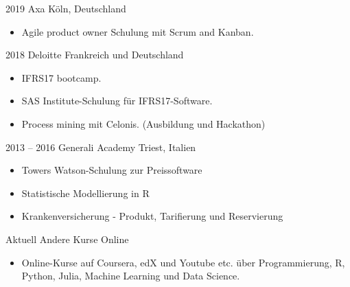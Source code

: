 \documentclass[a4paper,]{fortysecondscv}
\begin{document}
\begin{cvtable}[2]
    \cvitem
    {2019}
    {Axa}
    {Köln, Deutschland}
    {
        \vspace{-\topsep}
        \begin{itemize}[nosep, leftmargin=0pt, label={}]
            \item Agile product owner Schulung mit Scrum and Kanban.
        \end{itemize}
    }
    \cvitem
    {2018}
    {Deloitte}
    {Frankreich und Deutschland}
    {
        \vspace{-\topsep}
        \begin{itemize}[nosep, leftmargin=0pt, label={}]
            \item IFRS17 bootcamp.
            \item SAS Institute-Schulung für IFRS17-Software.
            \item Process mining mit Celonis. (Ausbildung und Hackathon)
        \end{itemize}
    }
    \cvitem
    {2013 -- 2016}
    {Generali Academy}
    {Triest, Italien}
    {
        \vspace{-\topsep}
        \begin{itemize}[nosep, leftmargin=0pt, label={}]
            \item Towers Watson-Schulung zur Preissoftware
            \item Statistische Modellierung in R
            \item Krankenversicherung - Produkt, Tarifierung und Reservierung
        \end{itemize}
    }
    \cvitem
    {Aktuell}
    {Andere Kurse}
    {Online}
    {
        \vspace{-\topsep}
        \begin{itemize}[nosep, leftmargin=0pt, label={}]
            \item Online-Kurse auf Coursera, edX und Youtube etc. über Programmierung, R, Python, Julia, Machine Learning und Data Science.
        \end{itemize}
    }
\end{cvtable}


\begin{cvtable}[1.1]
\end{cvtable}

\end{document}
